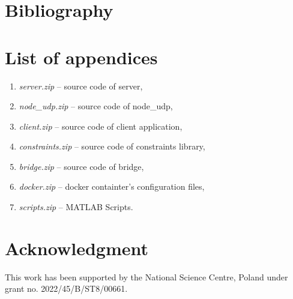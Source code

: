 \chapter{Bibliography}
\printbibliography[heading=none]





\chapter*{List of appendices}

\begin{enumerate}
	\item \textit{server.zip} -- source code of server,
	\item \textit{node\_udp.zip} -- source code of node\_udp,
	\item \textit{client.zip} -- source code of client application,
	\item \textit{constraints.zip} -- source code of constraints library,
	\item \textit{bridge.zip} -- source code of bridge,
	\item \textit{docker.zip} -- docker containter's configuration files,
	\item \textit{scripts.zip} -- MATLAB Scripts.
\end{enumerate}
\thispagestyle{empty}

\chapter*{Acknowledgment}

This work has been supported by the National Science Centre, Poland under grant no. 2022/45/B/ST8/00661.